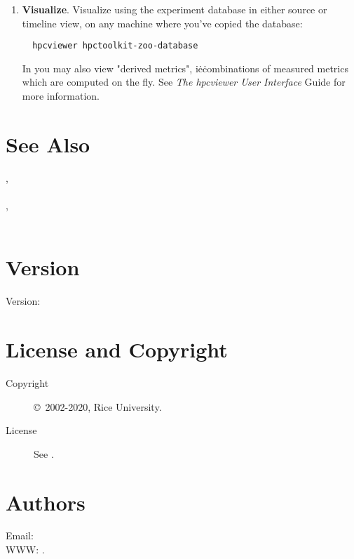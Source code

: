 \documentclass[english]{article}
\begin{document}
\begin{enumerate}
\item \textbf{Visualize}.
Visualize using 
the experiment database in either source or timeline view,
on any machine where you've copied the database:
\begin{verbatim}
  hpcviewer hpctoolkit-zoo-database
\end{verbatim}
In  you may also view "derived metrics",
i\.e\. combinations of measured metrics which are computed on the fly.
See \emph{The hpcviewer User Interface} Guide for more information.

\end{enumerate}



\section{See Also}

,
   \\
 \\
,
   \\
  \SP\SP {} \\

\section{Version}

Version: \Version

\section{License and Copyright}

\begin{description}
\item[Copyright] \copyright\ 2002-2020, Rice University.
\item[License] See .
\end{description}

\section{Authors}

Email:  \\
WWW: .

\LatexManEnd
\end{document}
